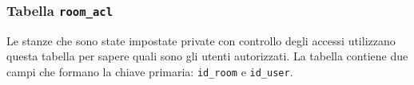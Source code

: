 \subsubsection{Tabella \texttt{room\_acl}}

Le stanze che sono state impostate private con controllo degli accessi utilizzano questa tabella per sapere quali sono gli utenti autorizzati. La tabella contiene due campi che formano la chiave primaria: \texttt{id\_room} e \texttt{id\_user}.

